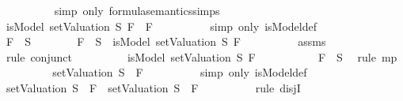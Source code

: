 \begin{isabellebody}
\ \ \ \ \ \ \ \ \isamarkupfalse%
\ {\isacharparenleft}simp\ only{\isacharcolon}\ formula{\isacharunderscore}semantics{\isachardot}simps{\isacharparenleft}{}{\isacharparenright}{\isacharparenright}\isanewline
\ \ \ \ \ \ \isamarkupfalse%
\ {\isachardoublequoteopen}isModel\ {\isacharparenleft}setValuation\ S{\isacharparenright}\ {\isacharparenleft}F{}\ \isactrlbold {\isasymor}\ F{}{\isacharparenright}{\isachardoublequoteclose}\isanewline
\ \ \ \ \ \ \ \ \isamarkupfalse%
\ {\isacharparenleft}simp\ only{\isacharcolon}\ isModel{\isacharunderscore}def{\isacharparenright}\isanewline
\ \ \ \ \isamarkupfalse%
\isanewline
\ \ \ \ \ \ \isamarkupfalse%
\ {\isachardoublequoteopen}F{}\ {\isasymin}\ S{\isachardoublequoteclose}\isanewline
\ \ \ \ \ \ \isamarkupfalse%
\ {\isachardoublequoteopen}F{}\ {\isasymin}\ S\ {\isasymlongrightarrow}\ isModel\ {\isacharparenleft}setValuation\ S{\isacharparenright}\ F{}{\isachardoublequoteclose}\isanewline
\ \ \ \ \ \ \ \ \isamarkupfalse%
\ assms{\isacharparenleft}{}{\isacharparenright}\ \isamarkupfalse%
\ {\isacharparenleft}rule\ conjunct{}{\isacharparenright}\isanewline
\ \ \ \ \ \ \isamarkupfalse%
\ \isamarkupfalse%
\ {\isachardoublequoteopen}isModel\ {\isacharparenleft}setValuation\ S{\isacharparenright}\ F{}{\isachardoublequoteclose}\ \isanewline
\ \ \ \ \ \ \ \ \isamarkupfalse%
\ {\isacartoucheopen}F{}\ {\isasymin}\ S{\isacartoucheclose}\ \isamarkupfalse%
\ {\isacharparenleft}rule\ mp{\isacharparenright}\isanewline
\ \ \ \ \ \ \isamarkupfalse%
\ \isamarkupfalse%
\ {\isachardoublequoteopen}{\isacharparenleft}setValuation\ S{\isacharparenright}\ {\isasymTurnstile}\ F{}{\isachardoublequoteclose}\isanewline
\ \ \ \ \ \ \ \ \isamarkupfalse%
\ {\isacharparenleft}simp\ only{\isacharcolon}\ isModel{\isacharunderscore}def{\isacharparenright}\isanewline
\ \ \ \ \ \ \isamarkupfalse%
\ \isamarkupfalse%
\ {\isachardoublequoteopen}{\isacharparenleft}setValuation\ S{\isacharparenright}\ {\isasymTurnstile}\ F{}\ {\isasymor}\ {\isacharparenleft}setValuation\ S{\isacharparenright}\ {\isasymTurnstile}\ F{}{\isachardoublequoteclose}\isanewline
\ \ \ \ \ \ \ \ \isamarkupfalse%
\ {\isacharparenleft}rule\ disjI{}{\isacharparenright}\isanewline

\end{isabellebody}

